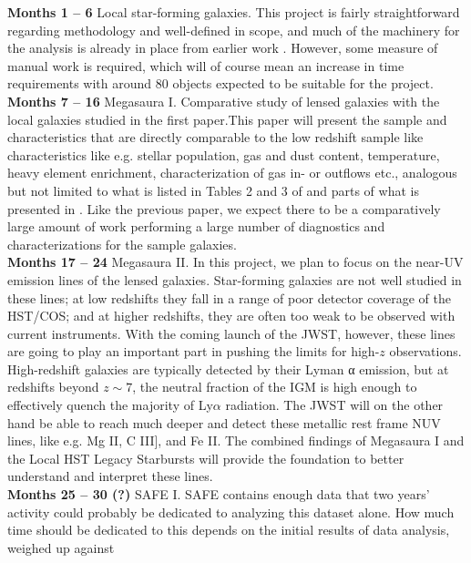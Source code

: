 \documentclass[12pt, a4paper]{scrartcl}
\begin{document}
\textbf{\sffamily Months 1 -- 6} Local star-forming galaxies. This project is
fairly straightforward regarding methodology and well-defined in scope, and much
of the machinery for the analysis is already in place from earlier work
\citep{RiveraThorsen2015,RiveraThorsen2015}. However, some measure of manual
work is required, which will of course mean an increase in time requirements
with around 80 objects expected to be suitable for the project.\\
\textbf{\sffamily Months 7 -- 16} Megasaura I. Comparative study of lensed galaxies
		with the local galaxies studied in the first paper.This paper
		will present the sample and characteristics that are directly
		comparable to the low redshift sample like  characteristics like e.g.
		stellar population, gas and dust content, temperature, heavy
		element enrichment, characterization of gas in- or outflows
		etc., analogous but not limited to what is listed in Tables 2
		and 3 of \cite{LARSI} and parts of what is presented in
		\cite{RiveraThorsen2015}. Like the previous paper, we expect 
		there to be a comparatively large amount of work performing a
		large number of diagnostics and characterizations for the sample
		galaxies. \\
\textbf{\sffamily Months 17 -- 24} Megasaura II. In this project, we plan to focus 
		on the near-UV emission lines of the lensed galaxies. 
		Star-forming galaxies are not well studied in these lines; at 
		low redshifts they fall in a range of poor detector coverage of 
		the HST/COS; and at higher redshifts, they are often too weak 
		to be observed with current instruments. With the coming launch 
		of the JWST, however, these lines are going to play an important 
		part in pushing the limits for high-$z$ observations. 
		High-redshift galaxies are typically detected by their Lyman α 
		emission, but at redshifts beyond $z \sim 7$, the neutral fraction of
		the IGM is high enough to effectively quench the majority of 
		Ly$\alpha$ radiation.  The JWST will on the other hand be able 
		to reach much deeper and detect these metallic rest frame NUV 
		lines, like e.g. Mg II, C III], and Fe II. The combined findings 
		of Megasaura I and the Local HST Legacy Starbursts will provide 
		the foundation to better understand and interpret these lines.\\
\textbf{\sffamily Months 25 -- 30 (?)} SAFE I. SAFE contains enough data that two
		years' activity could probably be dedicated to analyzing this
		dataset alone. How much time should be dedicated to this depends
		on the initial results of data analysis, weighed up against
\end{document}
